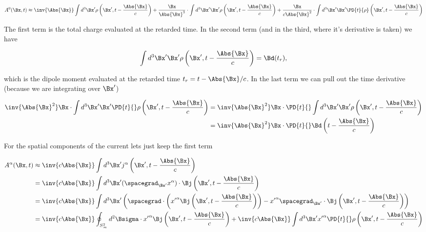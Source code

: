 \begin{equation}\label{eqn:relativisticElectrodynamicsL20:210}
A^0(\Bx, t) 
\approx 
\inv{\Abs{\Bx}} \int d^3 \Bx' \rho\left(\Bx', t - \frac{\Abs{\Bx}}{c}\right)
+\frac{\Bx}{\Abs{\Bx}^3} \cdot \int d^3 \Bx' \Bx' \rho \left(\Bx', t - \frac{\Abs{\Bx}}{c}\right)
+\frac{\Bx}{c \Abs{\Bx}^2} \cdot \int d^3 \Bx' \Bx' \PD{t}{\rho}\left(\Bx', t - \frac{\Abs{\Bx}}{c}\right)
\end{equation}

The first term is the total charge evaluated at the retarded time.  In the second term (and in the third, where it's derivative is taken) we have

\begin{equation}\label{eqn:relativisticElectrodynamicsL20:230}
\int d^3 \Bx' \Bx' \rho\left(\Bx', t - \frac{\Abs{\Bx}}{c}\right) = \Bd(t_r),
\end{equation}

which is the dipole moment evaluated at the retarded time $t_r = t - \Abs{\Bx}/c$.  In the last term we can pull out the time derivative (because we are integrating over $\Bx'$)

\begin{align*}
\inv{\Abs{\Bx}^2} \Bx \cdot \int d^3 \Bx' \Bx' \PD{t}{} \rho\left(\Bx', t - \frac{\Abs{\Bx}}{c}\right)
&=
\inv{\Abs{\Bx}^2} \Bx \cdot \PD{t}{} \int d^3 \Bx' \Bx' \rho\left(\Bx', t - \frac{\Abs{\Bx}}{c}\right) \\
&=
\inv{\Abs{\Bx}^2} \Bx \cdot \PD{t}{}\Bd \left(t - \frac{\Abs{\Bx}}{c}\right)
\end{align*}

For the spatial components of the current lets just keep the first term

\begin{align*}
A^\alpha(\Bx, t) 
&\approx
\inv{ c \Abs{\Bx}} \int d^3 \Bx' j^\alpha\left(\Bx', t - \frac{\Abs{\Bx}}{c}\right) \\
&=
\inv{ c \Abs{\Bx}} \int d^3 \Bx' (\spacegrad_{\Bx'} x^\alpha) \cdot \Bj\left(\Bx', t - \frac{\Abs{\Bx}}{c}\right)  \\
&=
\inv{ c \Abs{\Bx}} \int d^3 \Bx' 
\left(
\spacegrad \cdot \left( {x'}^\alpha \Bj \left(\Bx', t - \frac{\Abs{\Bx}}{c}\right) \right)
- {x'}^\alpha \spacegrad_{\Bx'} \cdot \Bj\left(\Bx', t - \frac{\Abs{\Bx}}{c}\right) 
\right) \\
&=
\inv{ c \Abs{\Bx}} \oint_{S^2_\infty} d^2 \Bsigma \cdot {x'}^\alpha \Bj\left(\Bx', t - \frac{\Abs{\Bx}}{c}\right)
+\inv{ c \Abs{\Bx}} \int d^3 \Bx' {x'}^\alpha \PD{t}{}\rho\left(\Bx', t - \frac{\Abs{\Bx}}{c}\right)
\end{align*}

